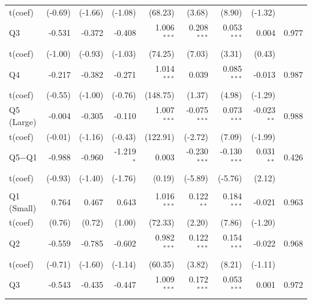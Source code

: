 {\begin{longtable}[t]{lrrrrrrrr}
\hspace{1em}t(coef) & (-0.69) & (-1.66) & (-1.08) & (68.23) & (3.68) & (8.90) & (-1.32) & \\
\hspace{1em}Q3 & -0.531 & -0.372 & -0.408 & 1.006$^{***}$ & 0.208$^{***}$ & 0.053$^{***}$ & 0.004 & 0.977\\
\hspace{1em}t(coef) & (-1.00) & (-0.93) & (-1.03) & (74.25) & (7.03) & (3.31) & (0.43) & \\
\hspace{1em}Q4 & -0.217 & -0.382 & -0.271 & 1.014$^{***}$ & 0.039 & 0.085$^{***}$ & -0.013 & 0.987\\
\hspace{1em}t(coef) & (-0.55) & (-1.00) & (-0.76) & (148.75) & (1.37) & (4.98) & (-1.29) & \\
\hspace{1em}Q5 (Large) & -0.004 & -0.305 & -0.110 & 1.007$^{***}$ & -0.075$^{***}$ & 0.073$^{***}$ & -0.023$^{**}$ & 0.988\\
\hspace{1em}t(coef) & (-0.01) & (-1.16) & (-0.43) & (122.91) & (-2.72) & (7.09) & (-1.99) & \\
\hspace{1em}Q5$-$Q1 & -0.988 & -0.960 & -1.219$^{*}$ & 0.003 & -0.230$^{***}$ & -0.130$^{***}$ & 0.031$^{**}$ & 0.426\\
\hspace{1em}t(coef) & (-0.93) & (-1.40) & (-1.76) & (0.19) & (-5.89) & (-5.76) & (2.12) & \\
\addlinespace[0.3em]
\hline
\multicolumn{9}{l}{Passive --- VW}\\
\hspace{1em}Q1 (Small) & 0.764 & 0.467 & 0.643 & 1.016$^{***}$ & 0.122$^{**}$ & 0.184$^{***}$ & -0.021 & 0.963\\
\hspace{1em}t(coef) & (0.76) & (0.72) & (1.00) & (72.33) & (2.20) & (7.86) & (-1.20) & \\
\hspace{1em}Q2 & -0.559 & -0.785 & -0.602 & 0.982$^{***}$ & 0.122$^{***}$ & 0.154$^{***}$ & -0.022 & 0.968\\
\hspace{1em}t(coef) & (-0.71) & (-1.60) & (-1.14) & (60.35) & (3.82) & (8.21) & (-1.11) & \\
\hspace{1em}Q3 & -0.543 & -0.435 & -0.447 & 1.009$^{***}$ & 0.172$^{***}$ & 0.053$^{***}$ & 0.001 & 0.972\\

\end{longtable}}
